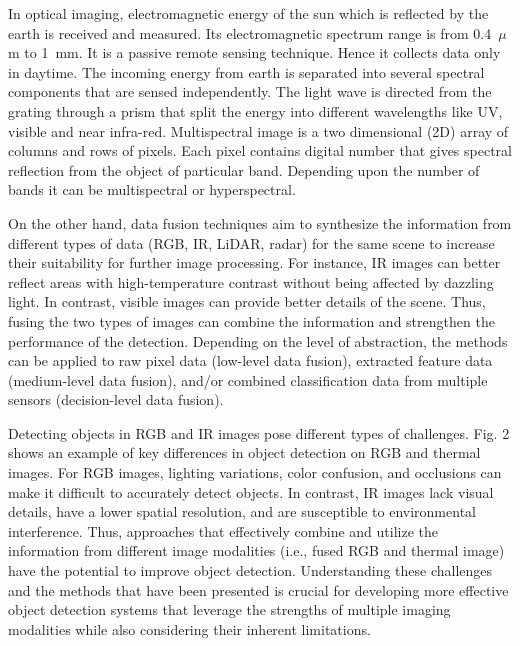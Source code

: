 \documentclass[12pt,oneside,bibtotoc,liststotoc]{scrbook}
\begin{document}
In optical imaging, electromagnetic energy of the sun which is
reflected by the earth is received and measured. Its
electromagnetic spectrum range is from 0.4~$\mu$m to 1~mm. It is a
passive remote sensing technique. Hence it collects data only in
daytime. The incoming energy from earth is separated into
several spectral components that are sensed independently. The
light wave is directed from the grating through a prism that split
the energy into different wavelengths like UV, visible and near
infra-red. Multispectral image is a two dimensional (2D) array
of columns and rows of pixels. Each pixel contains digital
number that gives spectral reflection from the object of
particular band. Depending upon the number of bands it can be
multispectral or hyperspectral.
\cite{agrawal2019comparativeRemoteSensing}



On the other hand, data fusion techniques aim to synthesize the
information from different types of data (RGB, IR, LiDAR, radar) for
the same scene to increase their suitability for further image processing.
For instance, IR images can better reflect areas with high-temperature
contrast without being affected by dazzling light. In contrast, visible 
images can provide better details of the scene. Thus, fusing the two types
of images can combine the information and strengthen the performance
of the detection. Depending on the level of abstraction, the methods can
be applied to raw pixel data (low-level data fusion), extracted feature
data (medium-level data fusion), and/or combined classification data
from multiple sensors (decision-level data fusion).
\cite{bustos2023reviewObjectDetectionIR}

Detecting objects in RGB and IR images pose different types of challenges. 
Fig. 2 shows an example of key differences in object detection
on RGB and thermal images. For RGB images, lighting variations, color
confusion, and occlusions can make it difficult to accurately detect
objects. In contrast, IR images lack visual details, have a lower spatial
resolution, and are susceptible to environmental interference. Thus,
approaches that effectively combine and utilize the information from
different image modalities (i.e., fused RGB and thermal image) have the
potential to improve object detection. Understanding these challenges
and the methods that have been presented is crucial for developing
more effective object detection systems that leverage the strengths
of multiple imaging modalities while also considering their inherent
limitations.
\cite{bustos2023reviewObjectDetectionIR}
\end{document}
